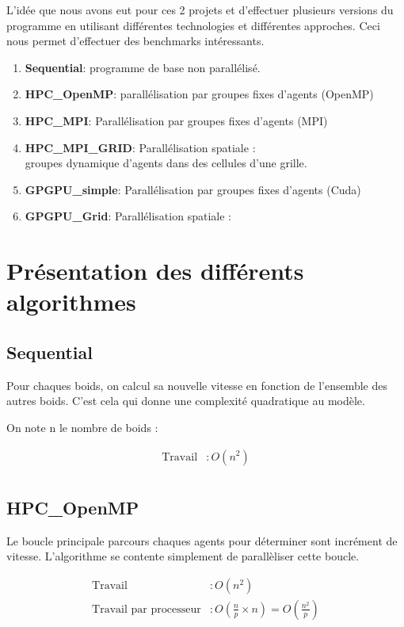 \documentclass[liens,entete-ensimag,margeCorrection]{ensirapport}
\begin{document}
L'idée que nous avons eut pour ces 2 projets et d'effectuer plusieurs versions du programme en utilisant différentes technologies et différentes approches.
Ceci nous permet d'effectuer des benchmarks intéressants.

\begin{enumerate}
    \item \textbf{Sequential}: programme de base non parallélisé.
    \item \textbf{HPC\_OpenMP}: parallélisation par groupes fixes d'agents (OpenMP)
    \item \textbf{HPC\_MPI}: Parallélisation par groupes fixes d'agents (MPI)
    \item \textbf{HPC\_MPI\_GRID}: Parallélisation spatiale : \\
                        groupes dynamique d'agents dans des cellules d'une grille.
    \item \textbf{GPGPU\_simple}: Parallélisation par groupes fixes d'agents (Cuda)
    \item \textbf{GPGPU\_Grid}: Parallélisation spatiale : 

\end{enumerate}


\section{Présentation des différents algorithmes}
\subsection{Sequential}

Pour chaques boids, on calcul sa nouvelle vitesse en fonction de l'ensemble des autres boids.
C'est cela qui donne une complexité quadratique au modèle.

On note n le nombre de boids :

\begin{align*}
    \text{Travail} &: O\left( n^2 \right)  \\
\end{align*}

\subsection{HPC\_OpenMP}
Le boucle principale parcours chaques agents pour déterminer sont incrément de vitesse.
L'algorithme se contente simplement de parallèliser cette boucle.

\begin{align*}
    \text{Travail} &: O\left( n^2 \right)  \\
    \text{Travail par processeur} &: O\left( \frac np \times n \right)  = O\left( \frac {n^2}p \right) \\
\end{align*}
\end{document}
